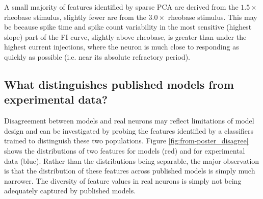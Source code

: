 


A small majority of features identified by sparse PCA are derived from the $1.5 \times$ rheobase stimulus, slightly fewer are from the $3.0\times$ rheobase stimulus.
This may be because spike time and spike count variability in the most sensitive (highest slope) part of the FI curve, slightly above rheobase, is greater than under the highest current injections, where the neuron is much close to responding as quickly as possible (i.e. near its absolute refractory period).

\subsection{What distinguishes published models from experimental data?}
Disagreement between models and real neurons may reflect limitations of model design and can be investigated by probing the features identified by a classifiers trained to distinguish these two populations. 
Figure \ref{fig:from-poster_disagree} shows the distributions of two features for models (red) and for experimental data (blue).
Rather than the distributions being separable, the major observation is that the distribution of these features across published models is simply much narrower.
The diversity of feature values in real neurons is simply not being adequately captured by published models.

